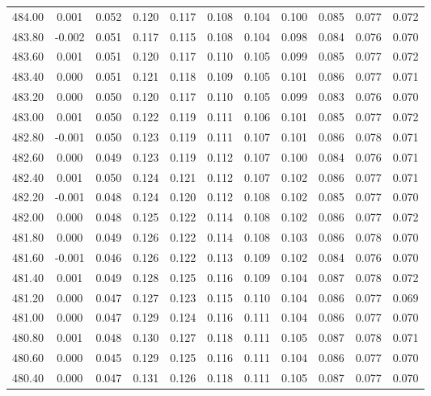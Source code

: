 \begin{longtable}{cccccccccc}
    484.00 &  0.001 &  0.052 &  0.120 &  0.117 &  0.108 &  0.104 &  0.100 &  0.085 &  0.077 &  0.072 \\
    483.80 & -0.002 &  0.051 &  0.117 &  0.115 &  0.108 &  0.104 &  0.098 &  0.084 &  0.076 &  0.070 \\
    483.60 &  0.001 &  0.051 &  0.120 &  0.117 &  0.110 &  0.105 &  0.099 &  0.085 &  0.077 &  0.072 \\
    483.40 &  0.000 &  0.051 &  0.121 &  0.118 &  0.109 &  0.105 &  0.101 &  0.086 &  0.077 &  0.071 \\
    483.20 &  0.000 &  0.050 &  0.120 &  0.117 &  0.110 &  0.105 &  0.099 &  0.083 &  0.076 &  0.070 \\
    483.00 &  0.001 &  0.050 &  0.122 &  0.119 &  0.111 &  0.106 &  0.101 &  0.085 &  0.077 &  0.072 \\
    482.80 & -0.001 &  0.050 &  0.123 &  0.119 &  0.111 &  0.107 &  0.101 &  0.086 &  0.078 &  0.071 \\
    482.60 &  0.000 &  0.049 &  0.123 &  0.119 &  0.112 &  0.107 &  0.100 &  0.084 &  0.076 &  0.071 \\
    482.40 &  0.001 &  0.050 &  0.124 &  0.121 &  0.112 &  0.107 &  0.102 &  0.086 &  0.077 &  0.071 \\
    482.20 & -0.001 &  0.048 &  0.124 &  0.120 &  0.112 &  0.108 &  0.102 &  0.085 &  0.077 &  0.070 \\
    482.00 &  0.000 &  0.048 &  0.125 &  0.122 &  0.114 &  0.108 &  0.102 &  0.086 &  0.077 &  0.072 \\
    481.80 &  0.000 &  0.049 &  0.126 &  0.122 &  0.114 &  0.108 &  0.103 &  0.086 &  0.078 &  0.070 \\
    481.60 & -0.001 &  0.046 &  0.126 &  0.122 &  0.113 &  0.109 &  0.102 &  0.084 &  0.076 &  0.070 \\
    481.40 &  0.001 &  0.049 &  0.128 &  0.125 &  0.116 &  0.109 &  0.104 &  0.087 &  0.078 &  0.072 \\
    481.20 &  0.000 &  0.047 &  0.127 &  0.123 &  0.115 &  0.110 &  0.104 &  0.086 &  0.077 &  0.069 \\
    481.00 &  0.000 &  0.047 &  0.129 &  0.124 &  0.116 &  0.111 &  0.104 &  0.086 &  0.077 &  0.070 \\
    480.80 &  0.001 &  0.048 &  0.130 &  0.127 &  0.118 &  0.111 &  0.105 &  0.087 &  0.078 &  0.071 \\
    480.60 &  0.000 &  0.045 &  0.129 &  0.125 &  0.116 &  0.111 &  0.104 &  0.086 &  0.077 &  0.070 \\
    480.40 &  0.000 &  0.047 &  0.131 &  0.126 &  0.118 &  0.111 &  0.105 &  0.087 &  0.077 &  0.070 \\

\end{longtable}
